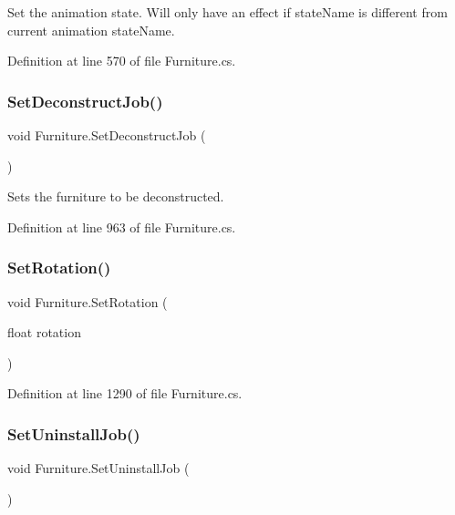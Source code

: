 Set the animation state. Will only have an effect if state\+Name is different from current animation state\+Name. 



Definition at line 570 of file Furniture.\+cs.

\mbox{\label{class_furniture_a3049fb349d8e8990ab703ca641488d59}} 
\subsubsection{\texorpdfstring{Set\+Deconstruct\+Job()}{SetDeconstructJob()}}
{\footnotesize\ttfamily void Furniture.\+Set\+Deconstruct\+Job (\begin{DoxyParamCaption}{ }\end{DoxyParamCaption})}



Sets the furniture to be deconstructed. 



Definition at line 963 of file Furniture.\+cs.

\mbox{\label{class_furniture_ac11b1b3875abe21193844976a90032de}} 
\subsubsection{\texorpdfstring{Set\+Rotation()}{SetRotation()}}
{\footnotesize\ttfamily void Furniture.\+Set\+Rotation (\begin{DoxyParamCaption}\item[{float}]{rotation }\end{DoxyParamCaption})}



Definition at line 1290 of file Furniture.\+cs.

\mbox{\label{class_furniture_afe6b540a3cc9ea3e3a7d951ad9d92097}} 
\subsubsection{\texorpdfstring{Set\+Uninstall\+Job()}{SetUninstallJob()}}
{\footnotesize\ttfamily void Furniture.\+Set\+Uninstall\+Job (\begin{DoxyParamCaption}{ }\end{DoxyParamCaption})}




